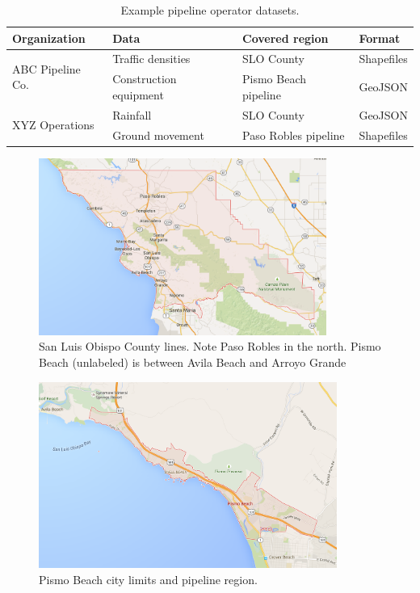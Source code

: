 \begin{table}[h]

\begin{tabular}{ |l|l|l|l| }
\hline
Organization & Data & Covered region & Format\\
\hline
\multirow{2}{*}{ABC Pipeline Co.}
 & Traffic densities & SLO County & Shapefiles \\ \cline{2-4}
 & Construction equipment & Pismo Beach pipeline & GeoJSON \\ \hline
\multirow{2}{*}{XYZ Operations}
 & Rainfall & SLO County & GeoJSON \\ \cline{2-4}
 & Ground movement & Paso Robles pipeline & Shapefiles \\ \hline
\end{tabular}
\caption{Example pipeline operator datasets.}
\label{table:layers}
\end{table}

\begin{figure}
    \centering
    \includegraphics[width=0.84\textwidth]{figures/county.png}
    \caption{San Luis Obispo County lines. Note Paso Robles in the north. Pismo Beach (unlabeled) is between Avila Beach and Arroyo Grande}
    \label{fig:county}
\end{figure}

\begin{figure}
    \centering
    \includegraphics[width=0.87\textwidth]{figures/pismo.png}
    \caption{Pismo Beach city limits and pipeline region.}
    \label{fig:pismo}
\end{figure}

